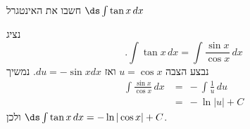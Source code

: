 חשבו את האינטגרל
$\ds \int \tan x \, dx$
\begin{solbox}
נציג
$$.\int \tan x\,dx=\int \frac{\sin x}{\cos x}\,dx$$
נבצע הצבה
$u=\cos x$
ואז
$du=-\sin x dx$.
נמשיך
\begin{align*}
\int \frac{\sin x}{\cos x}\,dx
&=\ -\int \frac{1}{u}\,du\\
&=\ -\ln|u|+C
\end{align*}
ולכן $\ds \int \tan x\,dx=-\ln|\cos x|+C$.
\end{solbox}
